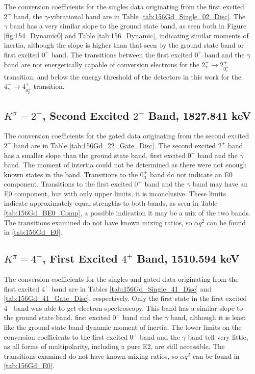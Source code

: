 The conversion coefficients for the singles data originating from the first excited $2^+$ band, the $\gamma$-vibrational band are in Table \ref{tab:156Gd_Single_02_Disc}. The $\gamma$ band has a very similar slope to the ground state band, as seen both in Figure \ref{fig:154_Dynamic0} and Table \ref{tab:156_Dynamic}, indicating similar moments of inertia, although the slope is higher than that seen by the ground state band or first excited $0^+$ band. The transitions between the first excited $0^+$ band and the $\gamma$ band are not energetically capable of conversion electrons for the $2^+_{\gamma}\rightarrow 2^+_{0^+_2}$ transition, and below the energy threshold of the detectors in this work for the $4^+_{\gamma}\rightarrow 4^+_{0^+_2}$ transition.



\subsection{$K^{\pi}=2^+$, Second Excited $2^+$ Band, 1827.841 keV}

The conversion coefficients for the gated data originating from the second excited $2^+$ band are in Table \ref{tab:156Gd_22_Gate_Disc}. The second excited $2^+$ band has a smaller slope than the ground state band, first excited $0^+$ band and the $\gamma$ band. The moment of intertia could not be determined as there were not enough known states in the band. Transitions to the $0^+_3$ band do not indicate an E0 component. Transitions to the first excited $0^+$ band and the $\gamma$ band may have an E0 component, but with only upper limits, it is inconclusive. These limits indicate approximately equal strengths to both bands, as seen in Table \ref{tab:156Gd_BE0_Comp}, a possible indication it may be a mix of the two bands. The transitions examined do not have known mixing ratios, so $\alpha q^2$ can be found in \ref{tab:156Gd_E0}.



\subsection{$K^{\pi}=4^+$, First Excited $4^+$ Band, 1510.594 keV}

The conversion coefficients for the singles and gated data originating from the first excited $4^+$ band are in Tables \ref{tab:156Gd_Single_41_Disc} and \ref{tab:156Gd_41_Gate_Disc}, respectively. Only the first state in the first excited $4^+$ band was able to get electron spectroscopy. This band has a similar slope to the ground state band, first excited $0^+$ band and the $\gamma$ band, although it is least like the ground state band dynamic moment of inertia. The lower limits on the conversion coefficients to the first excited $0^+$ band and the $\gamma$ band tell very little, as all forms of multipolarity, including a pure E2, are still accessible. The transitions examined do not have known mixing ratios, so $\alpha q^2$ can be found in \ref{tab:156Gd_E0}.

